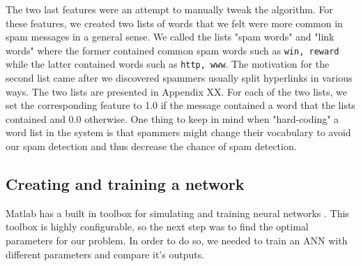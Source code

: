    The two last features were an attempt to manually tweak the algorithm.
    For these features, we created two lists of words that we felt were more
    common in spam messages in a general sense. We called the lists "spam
    words" and "link words" where the former contained common spam words such
    as \texttt{win, reward} while the latter contained words such as
    \texttt{http, www}. The motivation for the second list came after we
    discovered spammers usually split hyperlinks in various ways.
    The two lists are presented in Appendix XX. For each of the
    two lists, we set the corresponding feature to 1.0 if the
    message contained a word that the lists contained and 0.0 otherwise.
    One thing to keep in mind when "hard-coding" a word list in the system is
    that spammers might change their vocabulary to avoid our spam detection and
    thus decrease the chance of spam detection.    
  \subsection{Creating and training a network}


    Matlab has a built in toolbox for simulating and training neural networks
    \cite{matlab-nn}. 
    This toolbox is highly configurable, so the next step was to find the
    optimal parameters for our problem. In order to do so, we needed to train
    an ANN with different parameters and compare it's outputs. 
    
